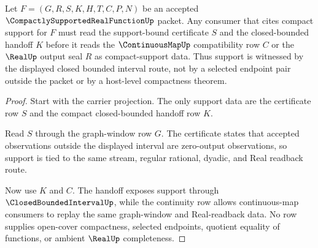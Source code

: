 \begin{theorem}
\label{thm:compactly-supported-real-function-support-bound}
Let $F=(G,R,S,K,H,T,C,P,N)$ be an accepted $\CompactlySupportedRealFunctionUp$ packet. Any consumer that cites compact support for $F$ must read the support-bound certificate $S$ and the closed-bounded handoff $K$ before it reads the $\ContinuousMapUp$ compatibility row $C$ or the $\RealUp$ output seal $R$ as compact-support data. Thus support is witnessed by the displayed closed bounded interval route, not by a selected endpoint pair outside the packet or by a host-level compactness theorem.
\end{theorem}
\begin{proof}
Start with the carrier projection. The only support data are the certificate row $S$ and the compact closed-bounded handoff row $K$.

Read $S$ through the graph-window row $G$. The certificate states that accepted observations outside the displayed interval are zero-output observations, so support is tied to the same stream, regular rational, dyadic, and Real readback route.

Now use $K$ and $C$. The handoff exposes support through $\ClosedBoundedIntervalUp$, while the continuity row allows continuous-map consumers to replay the same graph-window and Real-readback data. No row supplies open-cover compactness, selected endpoints, quotient equality of functions, or ambient $\RealUp$ completeness.
\end{proof}




